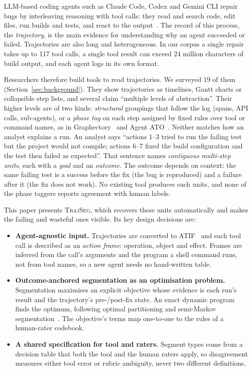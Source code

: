 \documentclass[sigconf,nonacm,10pt]{acmart}
\newcommand{\tool}{\textsc{TrajSeg}}   %
\begin{document}
LLM-based coding agents such as Claude Code, Codex and Gemini CLI repair bugs by
interleaving reasoning with tool calls: they read and search code, edit files, run
builds and tests, and react to the output~\cite{yao2023react,yang2024sweagent}. The
record of this process, the \emph{trajectory}, is the main evidence for
understanding why an agent succeeded or failed. Trajectories are also long and
heterogeneous. In our corpus a single repair takes up to 117 tool calls, a single
tool result can exceed 24 million characters of build output, and each agent logs in
its own format.

Researchers therefore build tools to read trajectories. We surveyed 19 of them
(Section~\ref{sec:background}). They show trajectories as timelines, Gantt charts or
collapsible step lists, and several claim ``multiple levels of abstraction''. Their
higher levels are of two kinds: \emph{structural} groupings that follow the log
(spans, API calls, sub-agents), or a \emph{phase tag} on each step assigned by fixed
rules over tool or command names, as in Graphectory~\cite{graphectory2026} and Agent
ATO~\cite{agentato2026}. Neither matches how an analyst explains a run. An analyst
says ``actions 1--3 tried to run the failing test but the project would not compile;
actions 6--7 fixed the build configuration and the test then failed as expected''.
That sentence names \emph{contiguous multi-step units}, each with a \emph{goal} and
an \emph{outcome}. The outcome depends on context: the same failing test is a success
before the fix (the bug is reproduced) and a failure after it (the fix does not
work). No existing tool produces such units, and none of the phase taggers reports
agreement with human labels.

This paper presents \tool{}, which recovers these units automatically and makes the
failing and wasteful ones visible. Its key design decisions are:
\begin{itemize}
  \item \textbf{Agent-agnostic input.} Trajectories are converted to
        ATIF~\cite{atif2026} and each tool call is described as an \emph{action
        frame}: operation, object and effect. Frames are inferred from the call's
        arguments and the program a shell command runs, not from tool names, so a
        new agent needs no hand-written table.
  \item \textbf{Outcome-anchored segmentation as an optimisation problem.}
        Segmentation maximises an explicit objective whose evidence is each run's
        result and the trajectory's pre-/post-fix state. An exact dynamic program
        finds the optimum, following optimal partitioning and semi-Markov
        segmentation~\cite{jackson2005optimal,sarawagi2004semicrf}. The objective's
        terms map one-to-one to the rules of a human-rater codebook.
  \item \textbf{A shared specification for tool and raters.} Segment types come
        from a decision table that both the tool and the human raters apply, so
        disagreement measures either tool error or rubric ambiguity, never two
        different definitions.
\end{itemize}
\end{document}
